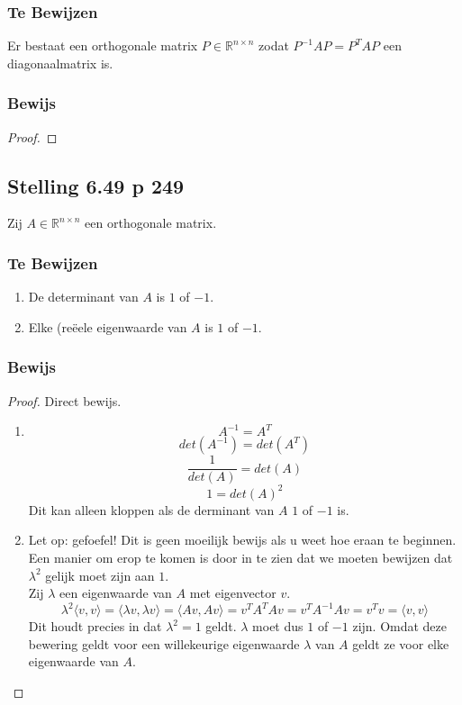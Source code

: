 \documentclass[lineaire_algebra_oplossingen.tex]{subfiles}
\begin{document}
\subsubsection*{Te Bewijzen}
Er bestaat een orthogonale matrix $P\in \mathbb{R}^{n\times n}$ zodat $P^{-1}AP = P^TAP$ een diagonaalmatrix is.
\subsubsection*{Bewijs}
\begin{proof}

\end{proof}

\subsection{Stelling 6.49 p 249}
Zij $A\in \mathbb{R}^{n\times n}$ een orthogonale matrix.
\subsubsection*{Te Bewijzen}
\begin{enumerate}
\item De determinant van $A$ is $1$ of $-1$.
\item Elke (re\"eele eigenwaarde van $A$ is $1$ of $-1$.
\end{enumerate}
\subsubsection*{Bewijs}
\begin{proof}
Direct bewijs.
\begin{enumerate}
\item
\[
A^{-1} = A^T
\]
\[
det(A^{-1}) = det(A^T)
\]
\[
\frac{1}{det(A)} = det(A)
\]
\[
1 = det(A)^2
\]
Dit kan alleen kloppen als de derminant van $A$ $1$ of $-1$ is.
\item
Let op: gefoefel! Dit is geen  moeilijk bewijs als u weet hoe eraan te beginnen. Een manier om erop te komen is door in te zien dat we moeten bewijzen dat $\lambda^2$ gelijk moet zijn aan $1$.\\
Zij $\lambda$ een eigenwaarde van $A$ met eigenvector $v$.
\[
\lambda^2\langle v,v\rangle = \langle \lambda v,\lambda v\rangle = \langle A v,A v\rangle = v^TA^T A v = v^TA^{-1} A v = v^Tv = \langle v, v \rangle
\]
Dit houdt precies in dat $\lambda^2 = 1$ geldt. $\lambda$ moet dus $1$ of $-1$ zijn. Omdat deze bewering geldt voor een willekeurige eigenwaarde $\lambda$ van $A$ geldt ze voor elke eigenwaarde van $A$.

\end{enumerate}
\end{proof}
\end{document}
